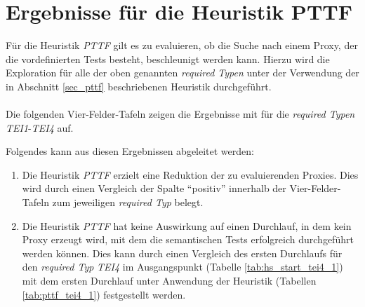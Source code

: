 \section{Ergebnisse für die Heuristik PTTF}\label{sec_evalPTTF}
Für die Heuristik \emph{PTTF} gilt es zu evaluieren, ob die Suche nach einem Proxy, der die vordefinierten Tests besteht, beschleunigt werden kann. Hierzu wird die Exploration für alle der oben genannten \emph{required Typen} unter der Verwendung der in Abschnitt \ref{sec_pttf} beschriebenen Heuristik durchgeführt.
\\\\
Die folgenden Vier-Felder-Tafeln zeigen die Ergebnisse mit für die \emph{required Typen} \emph{TEI1}-\emph{TEI4} auf.
\begin{multicols}{3}

\end{multicols}
\begin{multicols}{2}
\end{multicols}
Folgendes kann aus diesen Ergebnissen abgeleitet werden:
\begin{enumerate}
\item Die Heuristik \emph{PTTF} erzielt eine Reduktion der zu evaluierenden Proxies. Dies wird durch einen Vergleich der Spalte ``positiv'' innerhalb der Vier-Felder-Tafeln zum jeweiligen \emph{required Typ} belegt.

\item Die Heuristik \emph{PTTF} hat keine Auswirkung auf einen Durchlauf, in dem kein Proxy erzeugt wird, mit dem die semantischen Tests erfolgreich durchgeführt werden können. Dies kann durch einen Vergleich des ersten Durchlaufs für den \emph{required Typ} \emph{TEI4} im Ausgangspunkt (Tabelle \ref{tab:hs_start_tei4_1}) mit dem ersten Durchlauf unter Anwendung der Heuristik (Tabellen \ref{tab:pttf_tei4_1}) festgestellt werden.
\end{enumerate}